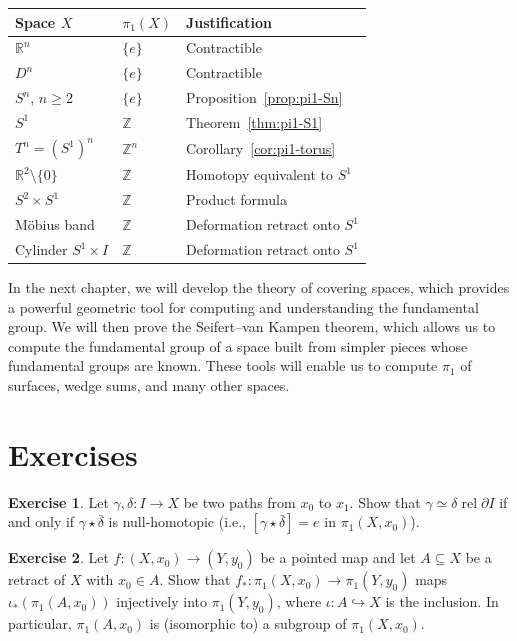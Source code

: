 \documentclass[12pt,a4paper,openany]{book}
\theoremstyle{definition}
\newtheorem{exercise}{Exercise}[chapter]
\theoremstyle{plain}
\theoremstyle{remark}
\newcommand{\Z}{\mathbb{Z}}
\newcommand{\R}{\mathbb{R}}
\newcommand{\rel}{\operatorname{rel}}
\begin{document}
\begin{center}
\renewcommand{\arraystretch}{1.4}
\begin{tabular}{@{}lll@{}}
\toprule
\textbf{Space $X$} & $\pi_1(X)$ & \textbf{Justification} \\
\midrule
$\R^n$ & $\{e\}$ & Contractible \\
$D^n$ & $\{e\}$ & Contractible \\
$S^n$, $n \ge 2$ & $\{e\}$ & Proposition~\ref{prop:pi1-Sn} \\
$S^1$ & $\Z$ & Theorem~\ref{thm:pi1-S1} \\
$T^n = (S^1)^n$ & $\Z^n$ & Corollary~\ref{cor:pi1-torus} \\
$\R^2 \setminus \{0\}$ & $\Z$ & Homotopy equivalent to $S^1$ \\
$S^2 \times S^1$ & $\Z$ & Product formula \\
M\"{o}bius band & $\Z$ & Deformation retract onto $S^1$ \\
Cylinder $S^1 \times I$ & $\Z$ & Deformation retract onto $S^1$ \\
\bottomrule
\end{tabular}
\label{tab:pi1-summary}
\end{center}

In the next chapter, we will develop the theory of covering spaces, which
provides a powerful geometric tool for computing and understanding the
fundamental group. We will then prove the Seifert--van Kampen theorem, which
allows us to compute the fundamental group of a space built from simpler pieces
whose fundamental groups are known. These tools will enable us to compute
$\pi_1$ of surfaces, wedge sums, and many other spaces.


\section{Exercises}\label{sec:ch2-exercises}

\begin{exercise}\label{exo:ch2-1}
Let $\gamma, \delta \colon I \to X$ be two paths from $x_0$ to $x_1$. Show that
$\gamma \simeq \delta \rel{\partial I}$ if and only if $\gamma \star
\bar{\delta}$ is null-homotopic (i.e., $[\gamma \star \bar{\delta}] = e$ in
$\pi_1(X, x_0)$).
\end{exercise}

\begin{exercise}\label{exo:ch2-2}
Let $f \colon (X, x_0) \to (Y, y_0)$ be a pointed map and let $A \subseteq X$
be a retract of $X$ with $x_0 \in A$. Show that $f_* \colon \pi_1(X, x_0) \to
\pi_1(Y, y_0)$ maps $\iota_*(\pi_1(A, x_0))$ injectively into $\pi_1(Y, y_0)$,
where $\iota \colon A \hookrightarrow X$ is the inclusion. In particular,
$\pi_1(A, x_0)$ is (isomorphic to) a subgroup of $\pi_1(X, x_0)$.
\end{exercise}
\end{document}
